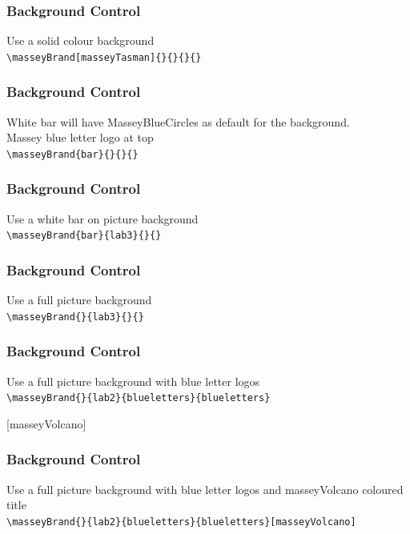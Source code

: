 \documentclass[10pt,aspectratio=43]{beamer}
\begin{document}
\begin{frame}[fragile]
\frametitle{Background Control}
Use a solid colour background \\[2ex]
\verb|\masseyBrand[masseyTasman]{}{}{}{}|

\end{frame}


\begin{frame}[fragile]
\frametitle{Background Control}
White bar will have MasseyBlueCircles as default for the background.\\
Massey blue letter logo at top\\[2ex]
\verb|\masseyBrand{bar}{}{}{}|
\end{frame}


\begin{frame}[fragile]
\frametitle{Background Control}
Use a white bar on picture background\\[2ex]
\verb|\masseyBrand{bar}{lab3}{}{}|
\end{frame}


\begin{frame}[fragile]
\frametitle{Background Control}
Use a full picture background\\[2ex]
\verb|\masseyBrand{}{lab3}{}{}|
\end{frame}


\begin{frame}[fragile]
\frametitle{Background Control}
Use a full picture background with blue letter logos\\[2ex]
\verb|\masseyBrand{}{lab2}{blueletters}{blueletters}|
\end{frame}

[masseyVolcano]

\begin{frame}[fragile]
\frametitle{Background Control}
Use a full picture background with blue letter logos and masseyVolcano coloured title \\[2ex]
\verb|\masseyBrand{}{lab2}{blueletters}{blueletters}[masseyVolcano]|

\end{frame}
\end{document}
